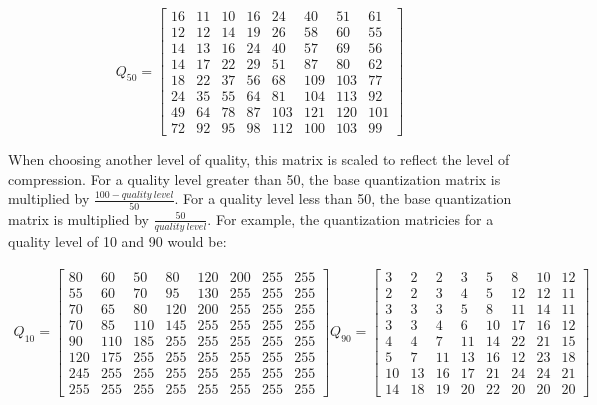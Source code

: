 \documentclass[11pt]{article}
\begin{document}
\begin{equation}
  \label{eqn:quantization50}
  Q_{50} = \begin{bmatrix}
    16 & 11 & 10 & 16 & 24 & 40 & 51 & 61 \\
    12 & 12 & 14 & 19 & 26 & 58 & 60 & 55 \\
    14 & 13 & 16 & 24 & 40 & 57 & 69 & 56 \\
    14 & 17 & 22 & 29 & 51 & 87 & 80 & 62 \\
    18 & 22 & 37 & 56 & 68 & 109 & 103 & 77 \\
    24 & 35 & 55 & 64 & 81 & 104 & 113 & 92 \\
    49 & 64 & 78 & 87 & 103 & 121 & 120 & 101 \\
    72 & 92 & 95 & 98 & 112 & 100 & 103 & 99
  \end{bmatrix}
\end{equation}

When choosing another level of quality, this matrix is scaled to reflect the level of compression.
For a quality level greater than 50, the base quantization matrix is multiplied by $\frac{100-quality ~level}{50}$.
For a quality level less than 50, the base quantization matrix is multiplied by $\frac{50}{quality ~level}$.
For example, the quantization matricies for a quality level of 10 and 90 would be:

\begin{align*}
  Q_{10} = \begin{bmatrix}
    80 & 60 & 50 & 80 & 120 & 200 & 255 & 255 \\
    55 & 60 & 70 & 95 & 130 & 255 & 255 & 255 \\
    70 & 65 & 80 & 120 & 200 & 255 & 255 & 255 \\
    70 & 85 & 110 & 145 & 255 & 255 & 255 & 255 \\
    90 & 110 & 185 & 255 & 255 & 255 & 255 & 255 \\
    120 & 175 & 255 & 255 & 255 & 255 & 255 & 255 \\
    245 & 255 & 255 & 255 & 255 & 255 & 255 & 255 \\
    255 & 255 & 255 & 255 & 255 & 255 & 255 & 255
  \end{bmatrix}
  Q_{90} = \begin{bmatrix}
    3 & 2 & 2 & 3 & 5 & 8 & 10 & 12 \\
    2 & 2 & 3 & 4 & 5 & 12 & 12 & 11 \\
    3 & 3 & 3 & 5 & 8 & 11 & 14 & 11 \\
    3 & 3 & 4 & 6 & 10 & 17 & 16 & 12 \\
    4 & 4 & 7 & 11 & 14 & 22 & 21 & 15 \\
    5 & 7 & 11 & 13 & 16 & 12 & 23 & 18 \\
    10 & 13 & 16 & 17 & 21 & 24 & 24 & 21 \\
    14 & 18 & 19 & 20 & 22 & 20 & 20 & 20 
  \end{bmatrix}
\end{align*}
\end{document}
